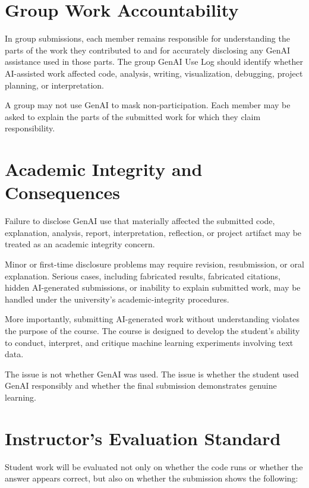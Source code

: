 \documentclass[11pt]{article}
\begin{document}
\section{Group Work Accountability}

In group submissions, each member remains responsible for understanding the parts of the work they contributed to and for accurately disclosing any GenAI assistance used in those parts. The group GenAI Use Log should identify whether AI-assisted work affected code, analysis, writing, visualization, debugging, project planning, or interpretation.

A group may not use GenAI to mask non-participation. Each member may be asked to explain the parts of the submitted work for which they claim responsibility.

\section{Academic Integrity and Consequences}

Failure to disclose GenAI use that materially affected the submitted code, explanation, analysis, report, interpretation, reflection, or project artifact may be treated as an academic integrity concern.

Minor or first-time disclosure problems may require revision, resubmission, or oral explanation. Serious cases, including fabricated results, fabricated citations, hidden AI-generated submissions, or inability to explain submitted work, may be handled under the university's academic-integrity procedures.

More importantly, submitting AI-generated work without understanding violates the purpose of the course. The course is designed to develop the student's ability to conduct, interpret, and critique machine learning experiments involving text data.

The issue is not whether GenAI was used. The issue is whether the student used GenAI responsibly and whether the final submission demonstrates genuine learning.

\section{Instructor's Evaluation Standard}

Student work will be evaluated not only on whether the code runs or whether the answer appears correct, but also on whether the submission shows the following:
\end{document}
